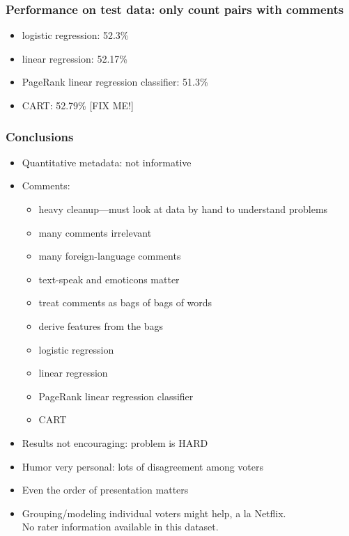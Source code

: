 \documentclass[fleqn]{beamer}
\begin{document}
\begin{frame}
\frametitle{Performance on test data: only count pairs with comments}
      \begin{itemize}
        \item logistic regression: 52.3\%
        \item linear regression: 52.17\%
        \item PageRank linear regression classifier: 51.3\%
        \item CART: 52.79\% [FIX ME!]
    \end{itemize}

\end{frame}

\begin{frame}
\frametitle{Conclusions}
    \begin{itemize}
        \item Quantitative metadata: not informative
        \item Comments: 
        	\begin{itemize}
	   \item heavy cleanup---must look at data by hand to understand problems
	   \item many comments irrelevant
	   \item many foreign-language comments
	   \item text-speak and emoticons matter
	   \item treat comments as bags of bags of words
	   \item derive features from the bags
	   \item logistic regression
	   \item linear regression
	   \item PageRank linear regression classifier
	   \item CART
	\end{itemize}
       \item Results not encouraging: problem is HARD
       \item Humor very personal: lots of disagreement among voters
       \item Even the order of presentation matters
       \item Grouping/modeling individual voters might help, a la Netflix. \\
                No rater information available in this dataset.
    \end{itemize}

\end{frame}
\end{document}
